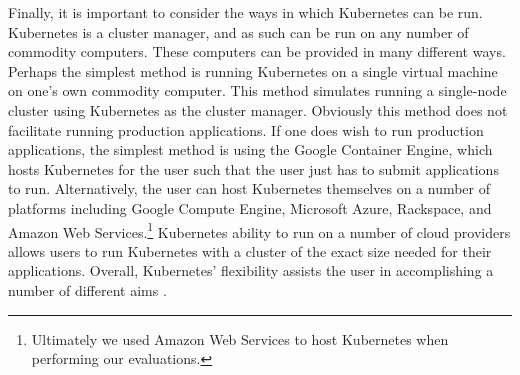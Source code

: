 Finally, it is important to consider the ways in which Kubernetes can be run.
Kubernetes is a cluster manager, and as such can be run on any number of commodity
computers. These computers can be provided in many different ways. Perhaps the
simplest method is running Kubernetes on a single virtual machine on one's own
commodity computer. This method simulates running a single-node cluster using
Kubernetes as the cluster manager. Obviously this method does not facilitate
running production applications. If one does wish to run production
applications, the simplest method is using the Google Container Engine, which
hosts Kubernetes for the user such that the user just has to submit applications to
run. Alternatively, the user can host Kubernetes themselves on a number of
platforms including Google Compute Engine, Microsoft Azure, Rackspace, and
Amazon Web Services.\footnote{Ultimately we used Amazon Web Services to
host Kubernetes when performing our evaluations.}
Kubernetes ability to run on a number of cloud providers
allows users to run Kubernetes with a cluster of the exact size needed for
their applications. Overall, Kubernetes' flexibility assists the user in
accomplishing a number of different aims \cite{getting-started-k8s}.
